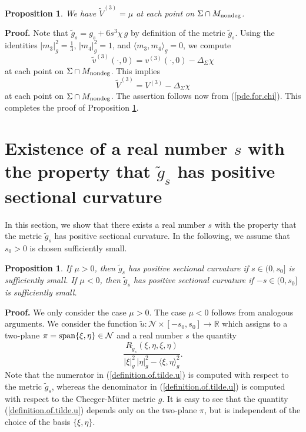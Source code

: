 \documentclass[11pt]{amsart}
\newtheorem{proposition}[theorem]{Proposition}
\theoremstyle{definition}
\begin{document}
\begin{proposition}
\label{third.order.change.in.sectional.curvature.pointwise.version}
We have $\tilde{V}^{(3)} = \mu$ at each point on $\Sigma \cap M_{\text{\rm nondeg}}$.
\end{proposition}

\textbf{Proof.}
Note that $\tilde{g}_s = g_s + 6s^3\chi \, g$ by definition of the metric $\tilde{g}_s$. Using the identities $|m_3|_g^2 = \frac{1}{3}$, $|m_4|_g^2 = 1$, and $\langle m_3,m_4 \rangle_g = 0$, we compute 
\[\tilde{v}^{(3)}(\cdot,0) = v^{(3)}(\cdot,0) - \Delta_\Sigma \chi\] 
at each point on $\Sigma \cap M_{\text{\rm nondeg}}$. This implies 
\[\tilde{V}^{(3)} = V^{(3)} - \Delta_\Sigma \chi\] 
at each point on $\Sigma \cap M_{\text{\rm nondeg}}$. The assertion follows now from (\ref{pde.for.chi}). This completes the proof of Proposition \ref{third.order.change.in.sectional.curvature.pointwise.version}. \\


\section{Existence of a real number $s$ with the property that $\tilde{g}_s$ has positive sectional curvature}

In this section, we show that there exists a real number $s$ with the property that the metric $\tilde{g}_s$ has positive sectional curvature. In the following, we assume that $s_0 > 0$ is chosen sufficiently small. 

\begin{proposition}
\label{positivity.of.sectional.curvature}
If $\mu > 0$, then $\tilde{g}_s$ has positive sectional curvature if $s \in (0,s_0]$ is sufficiently small. If $\mu < 0$, then $\tilde{g}_s$ has positive sectional curvature if $-s \in (0,s_0]$ is sufficiently small. 
\end{proposition}

\textbf{Proof.} 
We only consider the case $\mu > 0$. The case $\mu < 0$ follows from analogous arguments. We consider the function $\tilde{u}: \mathcal{N} \times [-s_0,s_0] \to \mathbb{R}$ which assigns to a two-plane $\pi = \text{\rm span}\{\xi,\eta\} \in \mathcal{N}$ and a real number $s$ the quantity 
\begin{equation} 
\label{definition.of.tilde.u}
\frac{R_{\tilde{g}_s}(\xi,\eta,\xi,\eta)}{|\xi|_g^2 \, |\eta|_g^2 - \langle \xi,\eta \rangle_g^2}. 
\end{equation}
Note that the numerator in (\ref{definition.of.tilde.u}) is computed with respect to the metric $\tilde{g}_s$, whereas the denominator in (\ref{definition.of.tilde.u}) is computed with respect to the Cheeger-M\"uter metric $g$. It is easy to see that the quantity (\ref{definition.of.tilde.u}) depends only on the two-plane $\pi$, but is independent of the choice of the basis $\{\xi,\eta\}$. 
\end{document}
